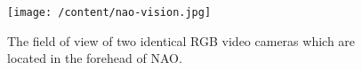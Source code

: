 \begin{figure}
	[h] \centering 
	\texttt{[image: /content/nao-vision.jpg]} \caption{The field of view of two identical RGB video cameras which are located in the forehead of NAO. \cite{8} } \label{fg:nao:vision} 
\end{figure}
